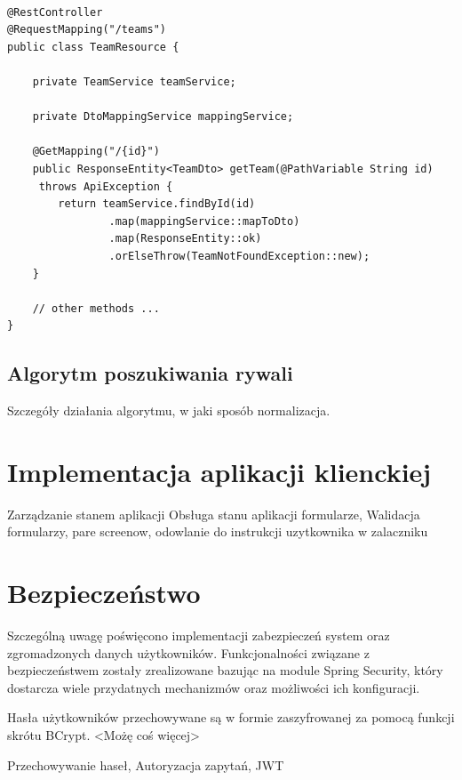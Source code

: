 \begin{minipage}{\linewidth}
\begin{lstlisting}[label=list:resource, caption=Przykładowa rejestracja kontrolera, basicstyle=\footnotesize\ttfamily]

@RestController
@RequestMapping("/teams")
public class TeamResource {

    private TeamService teamService;

    private DtoMappingService mappingService;

    @GetMapping("/{id}")
    public ResponseEntity<TeamDto> getTeam(@PathVariable String id)
     throws ApiException {
        return teamService.findById(id)
                .map(mappingService::mapToDto)
                .map(ResponseEntity::ok)
                .orElseThrow(TeamNotFoundException::new);
    }
    
    // other methods ...
}

\end{lstlisting}
\end{minipage}

\subsection{Algorytm poszukiwania rywali}

Szczegóły działania algorytmu, w jaki sposób normalizacja.

\section{Implementacja aplikacji klienckiej}

Zarządzanie stanem aplikacji Obsługa stanu aplikacji formularze, Walidacja formularzy, pare screenow, odowlanie do instrukcji uzytkownika w zalaczniku

\section{Bezpieczeństwo}

Szczególną uwagę poświęcono implementacji zabezpieczeń system oraz zgromadzonych danych użytkowników. Funkcjonalności związane z bezpieczeństwem zostały zrealizowane bazując na module Spring Security, który dostarcza wiele przydatnych mechanizmów oraz możliwości ich konfiguracji.

Hasła użytkowników przechowywane są w formie zaszyfrowanej za pomocą funkcji skrótu BCrypt. <Możę coś więcej>




Przechowywanie haseł, Autoryzacja zapytań, JWT
